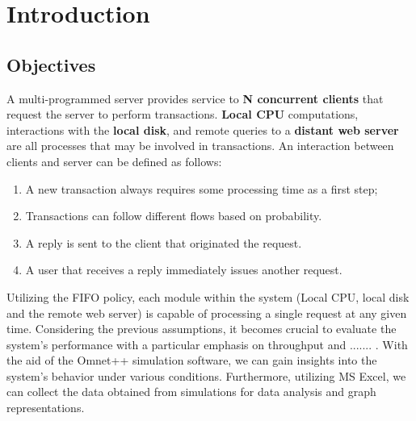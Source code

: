 \chapter{Introduction}
\section{Objectives}
A multi-programmed server provides service to \textbf{N concurrent clients} that request the server to perform transactions. \textbf{Local CPU} computations, interactions with the \textbf{local disk}, and remote queries to a \textbf{distant web server} are all processes that may be involved in transactions. 
An interaction between clients and server can be defined as follows: 
\begin{enumerate}
    \item A new transaction always requires some processing time as a first step;
    \item Transactions can follow different flows based on probability. 
    \item A reply is sent to the client that originated the request.
    \item A user that receives a reply immediately issues another request.
\end{enumerate}

Utilizing the FIFO policy, each module within the system (Local CPU, local disk and the remote web server) is capable of processing a single request at any given time.
Considering the previous assumptions, it becomes crucial to evaluate the system's performance with a particular emphasis on throughput and ....... . 
With the aid of the Omnet++ simulation software, we can gain insights into the system’s behavior under various conditions. Furthermore, utilizing MS Excel, we can collect the data obtained from simulations for data analysis and graph representations.
